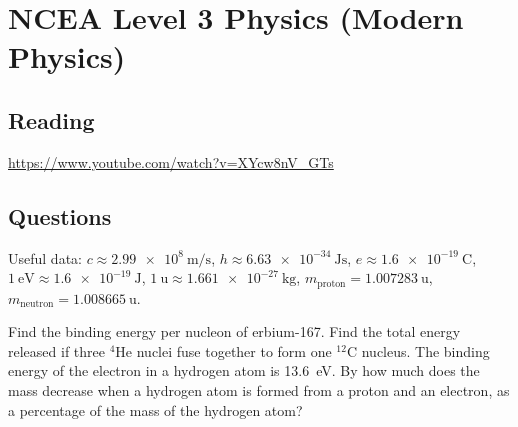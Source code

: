 \documentclass[answers]{exam}
\theoremstyle{definition}
\begin{document}
\section*{NCEA Level 3 Physics (Modern Physics)}
\subsection*{Reading}
\url{https://www.youtube.com/watch?v=XYcw8nV_GTs}

\subsection*{Questions}
Useful data: $ c \approx \SI{2.99e8}{\metre\per\second} $, $ h \approx \SI{6.63e-34}{\joule\second} $,
$ e \approx \SI{1.6e-19}{\coulomb} $, $ \SI{1}{\electronvolt} \approx \SI{1.6e-19}{\joule} $, $ \SI{1}{\amu} \approx \SI{1.661e-27}{\kilo\gram} $,
$ m_\text{proton} = \SI{1.007283}{\amu} $, $ m_\text{neutron} = \SI{1.008665}{\amu} $.

\begin{questions}
  \question Find the binding energy per nucleon of erbium-167.
  \question Find the total energy released if three $ ^4\mathrm{He} $ nuclei fuse together to form one $ ^{12}\mathrm{C} $ nucleus.
  \question The binding energy of the electron in a hydrogen atom is \SI{13.6}{\electronvolt}. By how much does the mass decrease
            when a hydrogen atom is formed from a proton and an electron, as a percentage of the mass of the hydrogen atom?
\end{questions}
\end{document}
